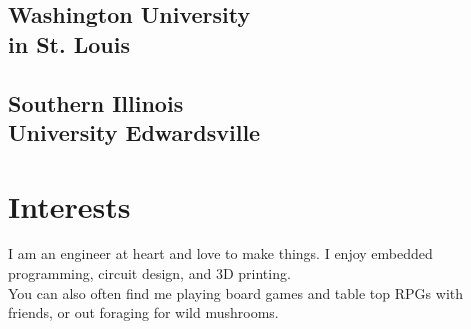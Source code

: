 \documentclass[]{deedy-resume-openfont}
\begin{document}
\begin{minipage}[t]{0.31\textwidth}
\subsection{Washington University \\in St. Louis} 
\sectionsep

\subsection{Southern Illinois \\University Edwardsville}
\sectionsep
{}
\sectionsep


\section{Interests}
I am an engineer at heart and love to make things. I enjoy embedded programming, circuit design, and 3D printing.\\
\sectionsep
You can also often find me playing board games and table top RPGs with friends, or out foraging for wild mushrooms.



%
%

\end{minipage} 
\hfill
\end{document}
